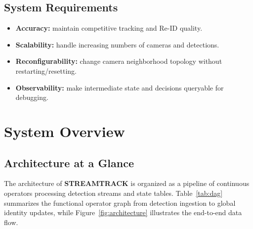 \documentclass[11pt]{article}
\begin{document}
\subsection{System Requirements}
\begin{itemize}[leftmargin=*]
    \item \textbf{Accuracy:} maintain competitive tracking and Re-ID quality.
    \item \textbf{Scalability:} handle increasing numbers of cameras and detections.
    \item \textbf{Reconfigurability:} change camera neighborhood topology without restarting/resetting.
    \item \textbf{Observability:} make intermediate state and decisions queryable for debugging.
\end{itemize}

\section{System Overview}\label{sec:overview}
\subsection{Architecture at a Glance}
The architecture of \textbf{STREAMTRACK} is organized as a pipeline of continuous operators processing detection streams and state tables. Table~\ref{tab:dag} summarizes the functional operator graph from detection ingestion to global identity updates, while Figure~\ref{fig:architecture} illustrates the end-to-end data flow.

\begin{table}[H]
    \centering
    \caption{Conceptual operator graph and state tables. Observations flow as streams, while tracklets and identities are maintained in relational tables updated by continuous joins.}
    \label{tab:dag}
\end{table}
\end{document}
